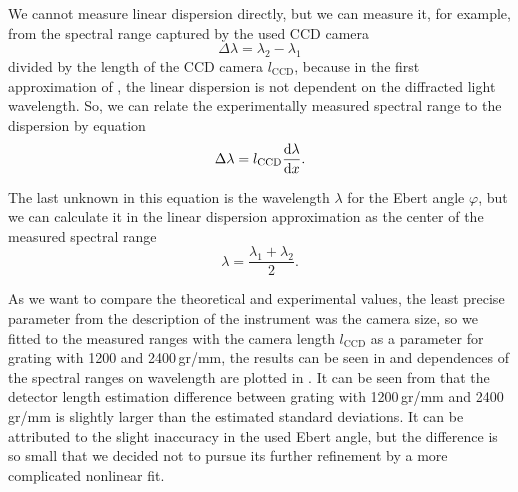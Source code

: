 We cannot measure linear dispersion directly, but we can measure it, for
example, from the spectral range captured by the used CCD camera
\begin{equation*}
	\Delta\lambda = \lambda_2 - \lambda_1
\end{equation*}
divided by the length of the CCD camera $l_\text{CCD}$, because in the first
approximation of
,
the linear dispersion is not dependent on the diffracted light wavelength.
So, we can relate the experimentally measured spectral range to the dispersion
by equation
\begin{equation}
	\Delta\lambda = l_\text{CCD}\frac{\text{d}\lambda}{\text{d}x}.
	\label{\eqnlabel{spectrograph_selection:measured_range}}
\end{equation}

The last unknown in this equation is the wavelength $\lambda$ for the Ebert
angle $\varphi$, but we can calculate it in the linear dispersion approximation
as the center of the measured spectral range
\begin{equation*}
	\lambda = \frac{\lambda_1 + \lambda_2}{2}.
\end{equation*}

As we want to compare the theoretical and experimental values, the least
precise parameter from the description of the instrument was the camera size,
so we fitted
to the measured ranges with the camera length $l_\text{CCD}$ as a parameter for
grating with 1200 and 2400\,gr/mm, the results can be seen in
and dependences of the spectral ranges on wavelength are plotted in
.
It can be seen from
that the detector length estimation difference between grating
with 1200\,gr/mm and 2400\,gr/mm is slightly larger than the estimated
standard deviations.
It can be attributed to the slight inaccuracy in the used Ebert angle, but the
difference is so small that we decided not to pursue its
further refinement by a more complicated nonlinear fit.

\begin{table}
	\centering
	
	\caption[%
		Results of fits of dispersion in dependence on a wavelength with
		detector length as a parameter for different gratings.%
	]{%
	}
	\label{\tablabel{spectrograph_selection:detector_length_fits}}
\end{table}

